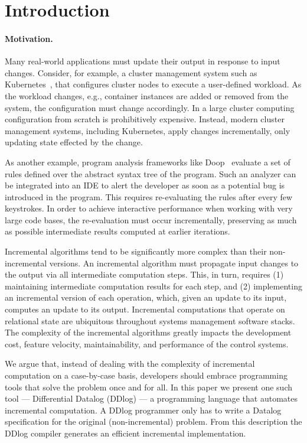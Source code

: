 \section{Introduction}\label{sec-introduction}

\paragraph{Motivation.}
Many real-world applications must update their output in response to input changes.  Consider, for
example, a cluster management system such as Kubernetes~\cite{kubernetes}, that configures cluster
nodes to execute a user-defined workload.  As the workload changes, e.g., container instances are
added or removed from the system, the configuration must change accordingly.  In a large cluster
computing configuration from scratch is prohibitively expensive.  Instead, modern cluster management
systems, including Kubernetes, apply changes incrementally, only updating state effected by the
change.

As another example, program analysis frameworks like Doop~\cite{Bravenboer-oopsla09} evaluate a set
of rules defined over the abstract syntax tree of the program.  Such an analyzer can be integrated
into an IDE to alert the developer as soon as a potential bug is introduced in the program.  This
requires re-evaluating the rules after every few keystrokes.  In order to achieve interactive
performance when working with very large code bases, the re-evaluation must occur incrementally,
preserving as much as possible intermediate results computed at earlier iterations.

Incremental algorithms tend to be significantly more complex than
their non-incremental versions.  An incremental algorithm must
propagate input changes to the output via all intermediate
computation steps.  This, in turn, requires (1) maintaining
intermediate computation results for each step, and (2) implementing
an incremental version of each operation, which, given an update to
its input, computes an update to its output.  Incremental computations
that operate on relational state are ubiquitous throughout systems
management software stacks.  The complexity of the incremental algorithms
greatly impacts the development cost, feature velocity,
maintainability, and performance of the control systems.

We argue that, instead of dealing with the complexity of incremental
computation on a case-by-case basis, developers should embrace
programming tools that solve the problem once and for all.  In this
paper we present one such tool --- Differential Datalog (DDlog)
--- a programming language that automates incremental computation.  A
DDlog programmer only has to write a Datalog specification for the
original (non-incremental) problem.  From this description the DDlog
compiler generates an efficient incremental implementation.

